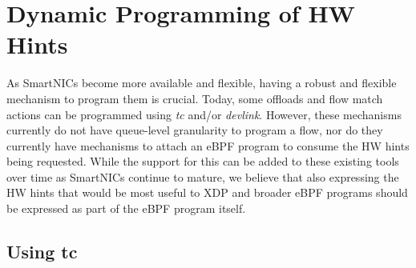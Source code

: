 \documentclass[letterpaper]{article}
\begin{document}
\section{Dynamic Programming of HW Hints}

As SmartNICs become more available and flexible, having a robust and flexible mechanism to program them is crucial. Today, some offloads and flow match actions can be programmed using \textit{tc} and/or \textit{devlink}. However, these mechanisms currently do not have queue-level granularity to program a flow, nor do they currently have mechanisms to attach an eBPF program to consume the HW hints being requested. While the support for this can be added to these existing tools over time as SmartNICs continue to mature, we believe that also expressing the HW hints that would be most useful to XDP and broader eBPF programs should be expressed as part of the eBPF program itself.

\subsection{Using tc}
\end{document}
